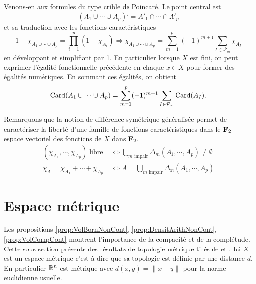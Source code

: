 \noindent Venons-en aux formules du type crible de Poincaré. Le point central est
\begin{displaymath}
  (A_1 \cup \cdots \cup A_p)' = A'_1 \cap \cdots \cap A'_p
\end{displaymath}
et sa traduction avec les fonctions caractéristiques
\begin{displaymath}
  1 - \chi_{A_1 \cup \cdots \cup A_p} = \prod_{i=1}^p(1 - \chi_{A_i})
  \Rightarrow
  \chi_{A_1 \cup \cdots \cup A_p} = \sum_{m=1}^p (-1)^{m+1}\sum_{I \in \mathcal{P}_m}\chi_{A_I}
\end{displaymath}
en développant et simplifiant par 1.\newline
En particulier lorsque $X$ est fini, on peut exprimer l'égalité fonctionnelle précédente en chaque $x\in X$ pour former des égalités numériques. En sommant ces égalités, on obtient
\begin{displaymath}
  \mathop{\mathrm{Card}}(A_1 \cup \cdots \cup A_p) = \sum_{m=1}^p (-1)^{m+1}\sum_{I \in \mathcal{P}_m}\mathop{\mathrm{Card}}(A_I).
\end{displaymath}

\noindent Remarquons que la notion de différence symétrique généralisée permet de caractériser la liberté d'une famille de fonctions caractéristiques dans le $\mathbf{F}_2$ espace vectoriel des fonctions de $X$ dans $\mathbf{F}_2$.
\begin{align*}
  (\chi_{A_1}, \cdots, \chi_{A_p}) \text{ libre } &\Leftrightarrow \bigcup_{m \text{ impair}} \Delta_m(A_1, \cdots, A_p) \not = \emptyset \\
  \chi_A = \chi_{A_1} + \cdots + \chi_{A_p} &\Leftrightarrow A = \bigcup_{m \text{ impair}} \Delta_m(A_1, \cdots, A_p)
\end{align*}


\section{Espace métrique} \label{Sec:EspMetric}
Les propositions \ref{prop:VolBornNonCont}, \ref{prop:DensitArithNonCont}, \ref{prop:VolCompCont} montrent l'importance de la compacité et de la complétude. Cette sous section présente des résultats de topologie métrique tirés de \cite{dieudonne1969elements} et \cite{koblitz2012p}.\newline
Ici $X$ est un espace métrique c'est à dire que sa topologie est définie par une distance $d$. En particulier $\mathbb{R}^n$ est métrique avec $d(x,y)=\| x-y\|$ pour la norme euclidienne usuelle.

